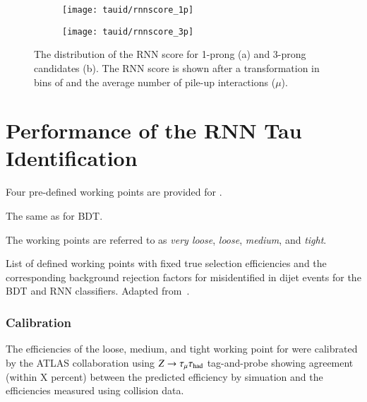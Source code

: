 \begin{figure}[htbp]
  \centering

  \begin{subfigure}{0.498\textwidth}
    \texttt{[image: tauid/rnnscore\_1p]}
    \subcaption{}
  \end{subfigure}\hfill%
  \begin{subfigure}{0.498\textwidth}
    \texttt{[image: tauid/rnnscore\_3p]}
    \subcaption{}
  \end{subfigure}

  \caption{The distribution of the RNN score for 1-prong (a) and
    3-prong \tauhadvis candidates (b). The RNN score is shown after a
    transformation in bins of \tauhadvis \pT and the average number of
    pile-up interactions ($\mu$).}%
  \label{fig:flattened_rnnscore}
\end{figure}


\section{Performance of the RNN Tau Identification}%
\label{sec:tauid_perf}

Four pre-defined working points are provided for \tauid.

The same as for BDT.

The working points are referred to as \emph{very loose}, \emph{loose},
\emph{medium}, and \emph{tight}.

\begin{table}
  \centering

  \caption{List of defined working points with fixed true \tauhadvis
    selection efficiencies and the corresponding background rejection
    factors for misidentified \tauhadvis in dijet events for the BDT
    and RNN classifiers. Adapted from~\cite{ATL-PHYS-PUB-2019-033}.}%
  \label{tab:rnn_wps}

  
\end{table}



\subsubsection{Calibration}


The efficiencies of the loose, medium, and tight working point for
\truetauhadvis were calibrated by the ATLAS collaboration using
$Z \to \tau_\mu \tau_{\text{had}}$ tag-and-probe showing agreement (within X
percent) between the predicted efficiency by simuation and the
efficiencies measured using collision data.



